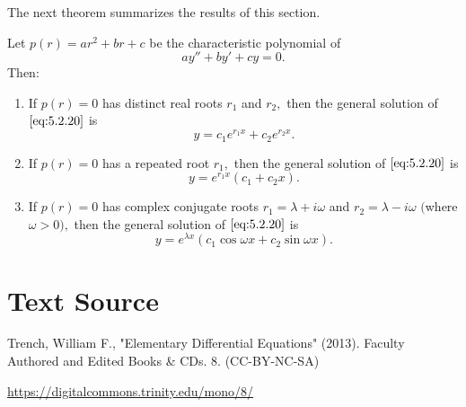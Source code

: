 \documentclass{ximera}
\begin{document}
The next theorem summarizes the results of this section.
 
\begin{theorem}\label{thmtype:5.2.1}
Let $p(r)=ar^2+br+c$ be the characteristic polynomial of
\begin{equation} \label{eq:5.2.20}
ay''+by'+cy=0.
\end{equation}
Then:
\begin{enumerate}
\item %
If $p(r)=0$  has distinct real roots $r_1$ and $r_2,$ then the general
solution of $\eqref{eq:5.2.20}$ is
$$
y=c_1e^{r_1x}+c_2e^{r_2x}.
$$
\item %
If $p(r)=0$  has a repeated root  $r_1,$ then
the general solution of $\eqref{eq:5.2.20}$ is
$$
y=e^{r_1x}(c_1+c_2x).
$$
\item %
If $p(r)=0$  has complex conjugate roots $r_1=\lambda+i\omega$ and
$r_2=\lambda-i\omega$ $($where $\omega>0),$ then the general solution
of $\eqref{eq:5.2.20}$ is
$$
y=e^{\lambda x}(c_1\cos\omega x+c_2\sin\omega x).
$$
\end{enumerate}
\end{theorem}
 
\section*{Text Source}
Trench, William F., "Elementary Differential Equations" (2013). Faculty Authored and Edited Books \& CDs. 8. (CC-BY-NC-SA)
 
\href{https://digitalcommons.trinity.edu/mono/8/}{https://digitalcommons.trinity.edu/mono/8/}
 
 
\end{document}
